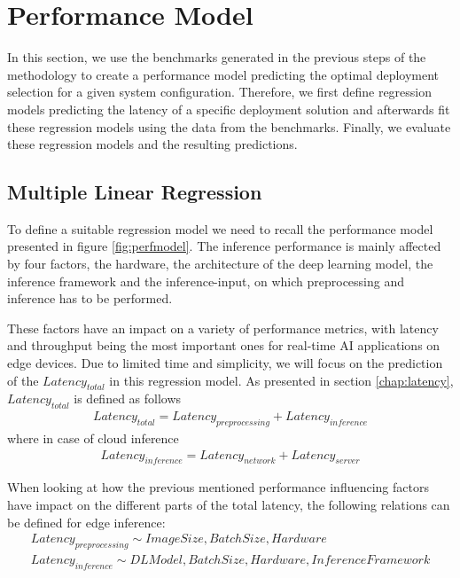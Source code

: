 \section{Performance Model}
\label{chap:perfModel}
In this section, we use the benchmarks generated in the previous steps of the methodology to create a performance model predicting the optimal deployment selection for a given system configuration.
Therefore, we first define regression models predicting the latency of a specific deployment solution and afterwards fit these regression models using the data from the benchmarks.
Finally, we evaluate these regression models and the resulting predictions.



\subsection{Multiple Linear Regression}
To define a suitable regression model we need to recall the performance model presented in figure \ref{fig:perfmodel}.
The inference performance is mainly affected by four factors, the hardware, the architecture of the deep learning model, the inference framework and the inference-input, on which preprocessing and inference has to be performed.

These factors have an impact on a variety of performance metrics, with latency and throughput being the most important ones for real-time AI applications on edge devices.
Due to limited time and simplicity, we will focus on the prediction of the $Latency_{total}$ in this regression model.
As presented in section \ref{chap:latency}, $Latency_{total}$ is defined as follows
\begin{equation*}
\begin{gathered}
Latency_{total} = Latency_{preprocessing}  + Latency_{inference}
\end{gathered}
\end{equation*}
where in case of cloud inference
\begin{equation*}
\begin{gathered}
Latency_{inference} = Latency_{network}  + Latency_{server}
\end{gathered}
\end{equation*}

When looking at how the previous mentioned performance influencing factors have impact on the different parts of the total latency, the following relations can be defined for edge inference:
\begin{equation*}
\begin{gathered}
 Latency_{preprocessing}\sim ImageSize, BatchSize, Hardware\\
 Latency_{inference} \sim DLModel, BatchSize, Hardware, Inference Framework\\
\end{gathered}
\end{equation*}

